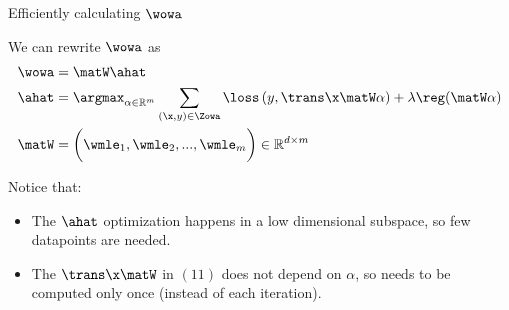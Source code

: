 \begin{frame}{Efficiently calculating $\wowa$}

%

\vspace{0.1in}
We can rewrite $\wowa$ as
\begin{align}
\wowa &= \matW \ahat
\\
\label{eq:afull}
\ahat &= \argmax_{\alpha\in\mathbb R^m} \sum _{(\x,y)\in \Zowa} \loss\left(y,\trans\x \matW \alpha \right)
+
\lambda \reg(\matW\alpha)
\\
\matW &= \bigg(\wmle_1, \wmle_2, ..., \wmle_m\bigg) \in \mathbb R^{d\times m}
\end{align}

%
%

\pause
Notice that:
\begin{itemize}

\item
The $\ahat$ optimization happens in a low dimensional subspace, so few datapoints are needed.

\pause
\item
The $\trans\x\matW$ in $(11)$ does not depend on $\alpha$, so needs to be computed only once (instead of each iteration).

%

\end{itemize}

\end{frame}


